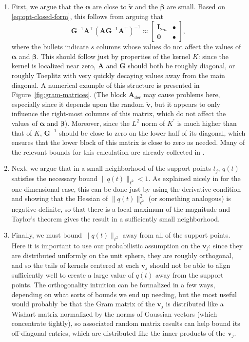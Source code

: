 \documentclass[11pt]{article}
\newcommand{\der}{\mathsf{der}}
\newcommand{\balpha}{\bm \alpha}
\newcommand{\bbeta}{\bm \beta}
\newcommand{\bA}{\bm A}
\newcommand{\bG}{\bm G}
\newcommand{\bv}{\bm v}
\begin{document}
\begin{enumerate}
\item First, we argue that the $\balpha$ are close to $\tilde{\bv}$ and the $\bbeta$ are small.
    Based on \eqref{eq:opt-closed-form}, this follows from arguing that
    \[ \bG^{-1}\bA^\top (\bA\bG^{-1}\bA^\top)^{-1} \approx \left[
            \begin{array}{cc} \bm I_{2m} & \bullet \\
              \bm 0 & \bullet
            \end{array}\right], \]
    where the bullets indicate $s$ columns whose values do not affect the values of $\balpha$ and $\bbeta$.
    This should follow just by properties of the kernel $K$: since the kernel is localized near zero, $\bA$ and $\bG$ should both be roughly diagonal, or roughly Toeplitz with very quickly decaying values away from the main diagonal.
    A numerical example of this structure is presented in Figure~\ref{fig:gram-matrices}.
    (The block $\bA_{\der}$ may cause problems here, especially since it depends upon the random $\tilde{\bv}$, but it appears to only influence the right-most columns of this matrix, which do not affect the values of $\balpha$ and $\bbeta$).
    Moreover, since the $L^2$ norm of $K^\prime$ is much higher than that of $K$, $\bG^{-1}$ should be close to zero on the lower half of its diagonal, which ensures that the lower block of this matrix is close to zero as needed.
    Many of the relevant bounds for this calculation are already collected in \cite{fernandez2016super}.

\item Next, we argue that in a small neighborhood of the support points $t_j$, $q(t)$ satisfies the necessary bound $\|q(t)\|_{\ell^2} < 1$.
    As explained nicely in \cite{tang2013compressed} for the one-dimensional case, this can be done just by using the derivative condition and showing that the Hessian of $\|q(t)\|_{\ell^2}^2$ (or something analogous) is negative-definite, so that there is a local maximum of the magnitude and Taylor's theorem gives the result in a sufficiently small neighborhood.

\item Finally, we must bound $\|q(t)\|_{\ell^2}$ away from all of the support points.
    Here it is important to use our probabilistic assumption on the $\bv_j$: since they are distributed uniformly on the unit sphere, they are roughly orthogonal, and so the tails of kernels centered at each $\bv_j$ should not be able to align sufficiently well to create a large value of $q(t)$ away from the support points.
    The orthogonality intuition can be formalized in a few ways, depending on what sorts of bounds we end up needing, but the most useful would probably be that the Gram matrix of the $\bv_j$ is distributed like a Wishart matrix normalized by the norms of Gaussian vectors (which concentrate tightly), so associated random matrix results can help bound its off-diagonal entries, which are distributed like the inner products of the $\bv_j$.
\end{enumerate}
\end{document}
